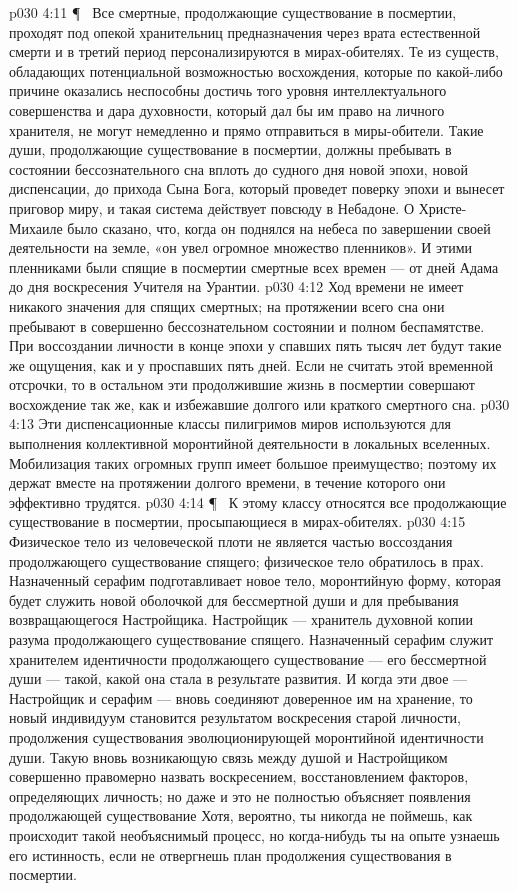 \vs p030 4:11 \P\ \bibnobreakspace {} Все смертные, продолжающие существование в посмертии, проходят под опекой хранительниц предназначения через врата естественной смерти и в третий период персонализируются в мирах\hyp{}обителях. Те из существ, обладающих потенциальной возможностью восхождения, которые по какой\hyp{}либо причине оказались неспособны достичь того уровня интеллектуального совершенства и дара духовности, который дал бы им право на личного хранителя, не могут немедленно и прямо отправиться в миры\hyp{}обители. Такие души, продолжающие существование в посмертии, должны пребывать в состоянии бессознательного сна вплоть до судного дня новой эпохи, новой диспенсации, до прихода Сына Бога, который проведет поверку эпохи и вынесет приговор миру, и такая система действует повсюду в Небадоне. О Христе\hyp{}Михаиле было сказано, что, когда он поднялся на небеса по завершении своей деятельности на земле, «он увел огромное множество пленников». И этими пленниками были спящие в посмертии смертные всех времен --- от дней Адама до дня воскресения Учителя на Урантии.
\vs p030 4:12 Ход времени не имеет никакого значения для спящих смертных; на протяжении всего сна они пребывают в совершенно бессознательном состоянии и полном беспамятстве. При воссоздании личности в конце эпохи у спавших пять тысяч лет будут такие же ощущения, как и у проспавших пять дней. Если не считать этой временной отсрочки, то в остальном эти продолжившие жизнь в посмертии совершают восхождение так же, как и избежавшие долгого или краткого смертного сна.
\vs p030 4:13 Эти диспенсационные классы пилигримов миров используются для выполнения коллективной моронтийной деятельности в локальных вселенных. Мобилизация таких огромных групп имеет большое преимущество; поэтому их держат вместе на протяжении долгого времени, в течение которого они эффективно трудятся.
\vs p030 4:14 \P\ \bibnobreakspace {} К этому классу относятся все продолжающие существование в посмертии, просыпающиеся в мирах\hyp{}обителях.
\vs p030 4:15 Физическое тело из человеческой плоти не является частью воссоздания продолжающего существование спящего; физическое тело обратилось в прах. Назначенный серафим подготавливает новое тело, моронтийную форму, которая будет служить новой оболочкой для бессмертной души и для пребывания возвращающегося Настройщика. Настройщик --- хранитель духовной копии разума продолжающего существование спящего. Назначенный серафим служит хранителем идентичности продолжающего существование --- его бессмертной души --- такой, какой она стала в результате развития. И когда эти двое --- Настройщик и серафим --- вновь соединяют доверенное им на хранение, то новый индивидуум становится результатом воскресения старой личности, продолжения существования эволюционирующей моронтийной идентичности души. Такую вновь возникающую связь между душой и Настройщиком совершенно правомерно назвать воскресением, восстановлением факторов, определяющих личность; но даже и это не полностью объясняет появления продолжающей существование  Хотя, вероятно, ты никогда не поймешь, как происходит такой необъяснимый процесс, но когда\hyp{}нибудь ты на опыте узнаешь его истинность, если не отвергнешь план продолжения существования в посмертии.
